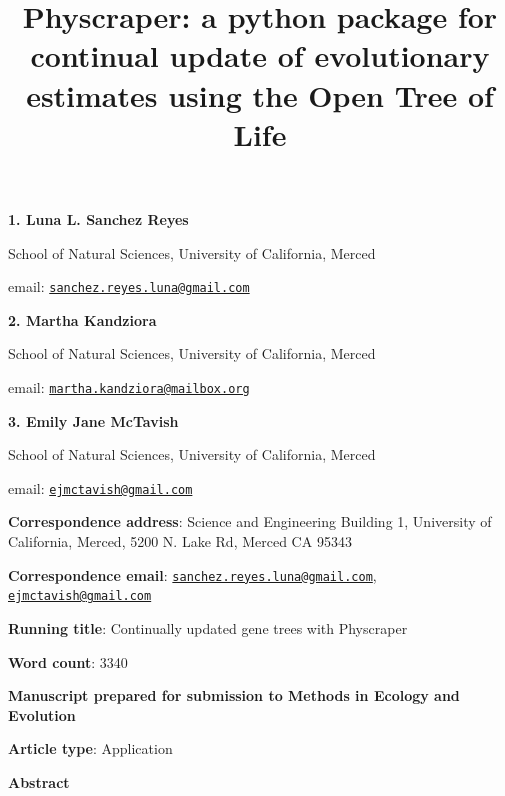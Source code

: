 \documentclass[]{article}
\title{Physcraper: a python package for continual update of evolutionary estimates using the Open Tree of Life}
\author{}
\date{\vspace{-2.5em}}
\begin{document}
\maketitle

\textbf{1. Luna L. Sanchez Reyes}

School of Natural Sciences, University of California, Merced

email: \href{mailto:sanchez.reyes.luna@gmail.com}{\nolinkurl{sanchez.reyes.luna@gmail.com}}

\textbf{2. Martha Kandziora}

School of Natural Sciences, University of California, Merced

email: \href{mailto:martha.kandziora@mailbox.org}{\nolinkurl{martha.kandziora@mailbox.org}}

\textbf{3. Emily Jane McTavish}

School of Natural Sciences, University of California, Merced

email: \href{mailto:ejmctavish@gmail.com}{\nolinkurl{ejmctavish@gmail.com}}

\textbf{Correspondence address}: Science and Engineering Building 1, University of California, Merced, 5200 N. Lake Rd, Merced CA 95343

\textbf{Correspondence email}: \href{mailto:sanchez.reyes.luna@gmail.com}{\nolinkurl{sanchez.reyes.luna@gmail.com}}, \href{mailto:ejmctavish@gmail.com}{\nolinkurl{ejmctavish@gmail.com}}

\textbf{Running title}: Continually updated gene trees with Physcraper

\textbf{Word count}: 3340

\textbf{Manuscript prepared for submission to Methods in Ecology and Evolution}

\textbf{Article type}: Application

\newpage

\begingroup\Large

\textbf{Abstract}
\endgroup
\end{document}
